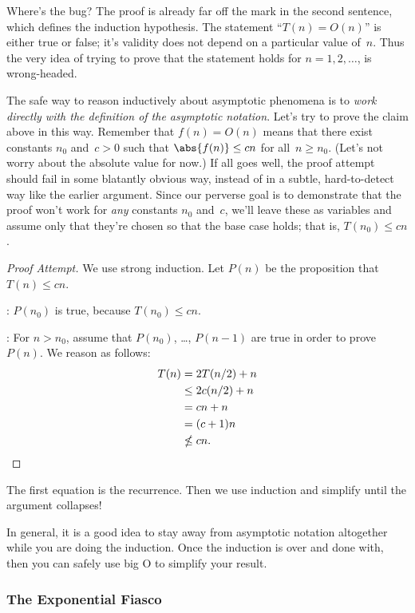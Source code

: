 \begin{editingnotes}
Where's the bug?  The proof is already far off the mark in the second
sentence, which defines the induction hypothesis.  The statement
``$T(n) = O(n)$'' is either true or false; it's validity does not
depend on a particular value of~$n$.  Thus the very idea of trying to
prove that the statement holds for $n = 1, 2, \dots$, is
wrong-headed.

The safe way to reason inductively about asymptotic phenomena is to
\emph{work directly with the definition of the asymptotic notation}.  Let's try
to prove the claim above in this way.  Remember that $f(n) = O(n)$
means that there exist constants $n_0$ and~$c > 0$ such that
$\abs{f(n)} \le cn$ for all~$n \ge n_0$.  (Let's not worry about the
absolute value for now.)  If all goes well, the proof attempt should
fail in some blatantly obvious way, instead of in a subtle,
hard-to-detect way like the earlier argument.  Since our perverse goal
is to demonstrate that the proof won't work for \emph{any} constants
$n_0$ and~$c$, we'll leave these as variables and assume only that
they're chosen so that the base case holds; that is, $T(n_0) \le cn$.

\begin{proof}[Proof Attempt]
We use strong induction.  Let $P(n)$ be the proposition that $T(n) \le
cn$.

:
$P(n_0)$ is true, because $T(n_0) \le cn$.

:
For $n > n_0$, assume that $P(n_0)$, \dots, $P(n - 1)$ are true in
order to prove~$P(n)$.  We reason as follows:
\begin{align*}
T(n)   &=  2 T(n/2) + n \\
      &\le 2 c(n/2) + n \\
      &=  cn + n \\
      &=  (c + 1) n \\
      &\nleq c n.  \qedhere
\end{align*}
\end{proof}

The first equation is the recurrence.  Then we use induction and
simplify until the argument collapses!

In general, it is a good idea to stay away from asymptotic notation
altogether while you are doing the induction.  Once the induction is
over and done with, then you can safely use big O to simplify your
result.
\end{editingnotes}

\subsubsection{The Exponential Fiasco}


